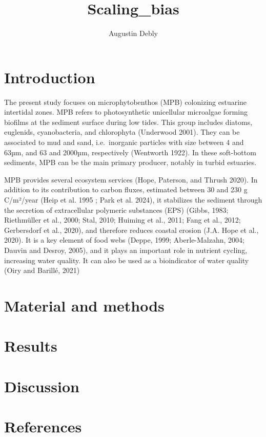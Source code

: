 \documentclass[
  letterpaper,
  DIV=11,
  numbers=noendperiod]{scrartcl}
\title{Scaling\_bias}
\author{Augustin Debly}
\date{}
\begin{document}
\maketitle

\section{Introduction}\label{introduction}

The present study focuses on microphytobenthos (MPB) colonizing
estuarine intertidal zones. MPB refers to photosynthetic unicellular
microalgae forming biofilms at the sediment surface during low tides.
This group includes diatoms, euglenids, cyanobacteria, and chlorophyta
(Underwood 2001). They can be associated to mud and sand, i.e.~inorganic
particles with size between 4 and 63µm, and 63 and 2000µm, respectively
(Wentworth 1922). In these soft-bottom sediments, MPB can be the main
primary producer, notably in turbid estuaries.

MPB provides several ecosystem services (Hope, Paterson, and Thrush
2020). In addition to its contribution to carbon fluxes, estimated
between 30 and 230 g C/m²/year (Heip et al. 1995 ; Park et al. 2024), it
stabilizes the sediment through the secretion of extracellular polymeric
substances (EPS) (Gibbs, 1983; Riethmüller et al., 2000; Stal, 2010;
Huiming et al., 2011; Fang et al., 2012; Gerbersdorf et al., 2020), and
therefore reduces coastal erosion (J.A. Hope et al., 2020). It is a key
element of food webs (Deppe, 1999; Aberle-Malzahn, 2004; Dauvin and
Desroy, 2005), and it plays an important role in nutrient cycling,
increasing water quality. It can also be used as a bioindicator of water
quality (Oiry and Barillé, 2021)

\section{Material and methods}\label{material-and-methods}

\section{Results}\label{results}

\section{Discussion}\label{discussion}

\section*{References}\label{references}
\end{document}
